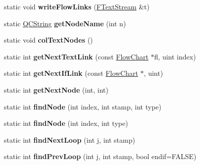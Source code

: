 \begin{DoxyCompactItemize}
\item 
\hypertarget{class_flow_chart_a0c703f16c3e0e7a553ba220e607b0499}{static void {\bfseries write\-Flow\-Links} (\hyperlink{class_f_text_stream}{F\-Text\-Stream} \&t)}\label{class_flow_chart_a0c703f16c3e0e7a553ba220e607b0499}

\item 
\hypertarget{class_flow_chart_a5453a46f0c6caf84eb262e8dd3b245d9}{static \hyperlink{class_q_c_string}{Q\-C\-String} {\bfseries get\-Node\-Name} (int n)}\label{class_flow_chart_a5453a46f0c6caf84eb262e8dd3b245d9}

\item 
\hypertarget{class_flow_chart_af89f20f5e1dcfef2d3c96661deacd265}{static void {\bfseries col\-Text\-Nodes} ()}\label{class_flow_chart_af89f20f5e1dcfef2d3c96661deacd265}

\item 
\hypertarget{class_flow_chart_adb650dc770f391944034e4d0cd13f4f1}{static int {\bfseries get\-Next\-Text\-Link} (const \hyperlink{class_flow_chart}{Flow\-Chart} $\ast$fl, uint index)}\label{class_flow_chart_adb650dc770f391944034e4d0cd13f4f1}

\item 
\hypertarget{class_flow_chart_adf46cfab36f43f01d565a37fda0f2360}{static int {\bfseries get\-Next\-If\-Link} (const \hyperlink{class_flow_chart}{Flow\-Chart} $\ast$, uint)}\label{class_flow_chart_adf46cfab36f43f01d565a37fda0f2360}

\item 
\hypertarget{class_flow_chart_a4747ea073655ff81cb8131a71ce162c6}{static int {\bfseries get\-Next\-Node} (int, int)}\label{class_flow_chart_a4747ea073655ff81cb8131a71ce162c6}

\item 
\hypertarget{class_flow_chart_a9e228eb13a595658b37f12ab9b7ca059}{static int {\bfseries find\-Node} (int index, int stamp, int type)}\label{class_flow_chart_a9e228eb13a595658b37f12ab9b7ca059}

\item 
\hypertarget{class_flow_chart_a5e46ab1e085d83b2ae0098ffa6f0777d}{static int {\bfseries find\-Node} (int index, int type)}\label{class_flow_chart_a5e46ab1e085d83b2ae0098ffa6f0777d}

\item 
\hypertarget{class_flow_chart_ac91e24f637c965d7754091e9fb9743ce}{static int {\bfseries find\-Next\-Loop} (int j, int stamp)}\label{class_flow_chart_ac91e24f637c965d7754091e9fb9743ce}

\item 
\hypertarget{class_flow_chart_ab88ec11da65512f5864191d6de262fbf}{static int {\bfseries find\-Prev\-Loop} (int j, int stamp, bool endif=F\-A\-L\-S\-E)}\label{class_flow_chart_ab88ec11da65512f5864191d6de262fbf}


\end{DoxyCompactItemize}
